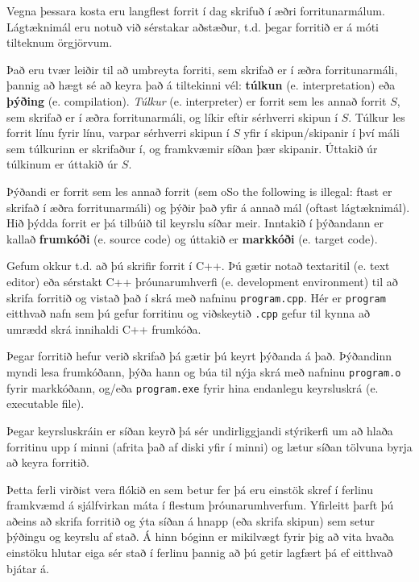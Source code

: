 Vegna þessara kosta eru langflest forrit í dag skrifuð í æðri forritunarmálum.
Lágtæknimál eru notuð við sérstakar aðstæður, t.d. þegar forritið er á móti tilteknum örgjörvum.


Það eru tvær leiðir til að umbreyta forriti, sem skrifað er í æðra forritunarmáli, þannig að hægt sé að keyra það á tiltekinni vél: {\bf túlkun} (e. interpretation) eða {\bf
þýðing} (e. compilation).
{\em Túlkur} (e. interpreter) er forrit sem les annað forrit $S$, sem skrifað er í æðra forritunarmáli, og líkir eftir sérhverri skipun í $S$.
Túlkur les forrit línu fyrir línu, varpar sérhverri skipun í $S$ yfir í skipun/skipanir í því máli sem túlkurinn er skrifaður í, og framkvæmir síðan þær skipanir.
Úttakið úr túlkinum er úttakið úr $S$.

\vspace{0.1in}
\centerline{}
\vspace{0.1in}

Þýðandi er forrit sem les annað forrit (sem oSo the
following is illegal: ftast er skrifað í æðra forritunarmáli) og þýðir það yfir á annað mál (oftast lágtæknimál).
Hið þýdda forrit er þá tilbúið til keyrslu síðar meir.
Inntakið í þýðandann er kallað {\bf frumkóði} (e. source code) og úttakið er {\bf markkóði} (e. target code).

Gefum okkur t.d. að þú skrifir forrit í C++.
Þú gætir notað textaritil (e. text editor) eða sérstakt C++ þróunarumhverfi (e. development environment) til að skrifa forritið og vistað það í skrá með nafninu {\tt program.cpp}.
Hér er {\tt program} eitthvað nafn sem þú gefur forritinu og viðskeytið {\tt .cpp} gefur til kynna að umrædd skrá innihaldi C++ frumkóða.

Þegar forritið hefur verið skrifað þá gætir þú keyrt þýðanda á það.
Þýðandinn myndi lesa frumkóðann, þýða hann og búa til nýja skrá með nafninu {\tt program.o} fyrir markkóðann,
og/eða {\tt program.exe} fyrir hina endanlegu keyrsluskrá (e. executable file).

\vspace{0.1in}
\centerline{}
\vspace{0.1in}

Þegar keyrsluskráin er síðan keyrð þá sér undirliggjandi stýrikerfi um að hlaða forritinu upp í minni (afrita það af diski yfir í minni) og lætur síðan tölvuna byrja að keyra forritið.

Þetta ferli virðist vera flókið en sem betur fer þá eru einstök skref í ferlinu framkvæmd á sjálfvirkan máta í flestum þróunarumhverfum.
Yfirleitt þarft þú aðeins að skrifa forritið og ýta síðan á hnapp (eða skrifa skipun) sem setur þýðingu og keyrslu af stað.
Á hinn bóginn er mikilvægt fyrir þig að vita hvaða einstöku hlutar eiga sér stað í ferlinu þannig að þú getir lagfært þá ef eitthvað bjátar á. 

